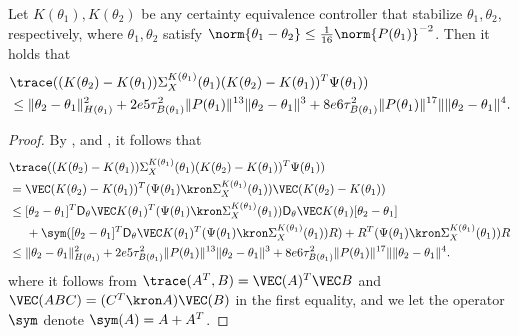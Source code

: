\begin{lemma}
    \label{lem: cost gap taylor substitution}
    Let $K(\theta_1), K(\theta_2)$ be any certainty equivalence controller that stabilize $\theta_1, \theta_2$, respectively, where $\theta_1, \theta_2$ satisfy $\norm{\theta_1-\theta_2}\leq \frac{1}{16} \norm{P(\theta_1)}^{-2}$. 
    Then it holds that
    \begin{align*}
        &\trace ((K(\theta_2)-K(\theta_1))\Sigma_X^{K(\theta_1)}(\theta_1)(K(\theta_2)-K(\theta_1))^T\Psi(\theta_1)) \\
        &\leq \|\theta_2-\theta_1\|_{H(\theta_1)}^2 + 2e5\tau_{B(\theta_1)}^2\|P(\theta_1)\|^{13}\|\theta_2-\theta_1\|^3 + 8e6\tau_{B(\theta_1)}^2\|P(\theta_1)\|^{17}\|\|\theta_2-\theta_1\|^4.
    \end{align*}
\end{lemma}
\begin{proof}
    By ,  and , it follows that
    \begin{align*}
        &\trace ((K(\theta_2)-K(\theta_1))\Sigma_X^{K(\theta_1)}(\theta_1)(K(\theta_2)-K(\theta_1))^T\Psi(\theta_1)) \\
        &= \VEC (K(\theta_2) - K(\theta_1))^T(\Psi(\theta_1)\kron\Sigma_X^{K(\theta_1)}(\theta_1))\VEC(K(\theta_2)-K(\theta_1)) \\
        &\leq [\theta_2 - \theta_1]^T\mathsf{D}_{\theta}\VEC K(\theta_1)^T(\Psi(\theta_1)\kron\Sigma_X^{K(\theta_1)}(\theta_1))\mathsf{D}_{\theta}\VEC K(\theta_1)[\theta_2 -\theta_1] \\
        &\hspace{5mm} + \sym([\theta_2 - \theta_1]^T\mathsf{D}_{\theta}\VEC K(\theta_1)^T(\Psi(\theta_1)\kron\Sigma_X^{K(\theta_1)}(\theta_1))R) + R^T(\Psi(\theta_1)\kron\Sigma_X^{K(\theta_1)}(\theta_1))R \\
        &\leq \|\theta_2-\theta_1\|_{H(\theta_1)}^2 + 2e5\tau_{B(\theta_1)}^2\|P(\theta_1)\|^{13}\|\theta_2-\theta_1\|^3 + 8e6\tau_{B(\theta_1)}^2\|P(\theta_1)\|^{17}\|\|\theta_2-\theta_1\|^4.
    \end{align*} 
    where it follows from $\trace(A^T, B) = \VEC (A)^T\VEC B$ and $\VEC (ABC) = (C^T\kron A)\VEC (B)$ in the first equality, and we let the operator $\sym$ denote $\sym(A) = A+A^T$. 
\end{proof}


